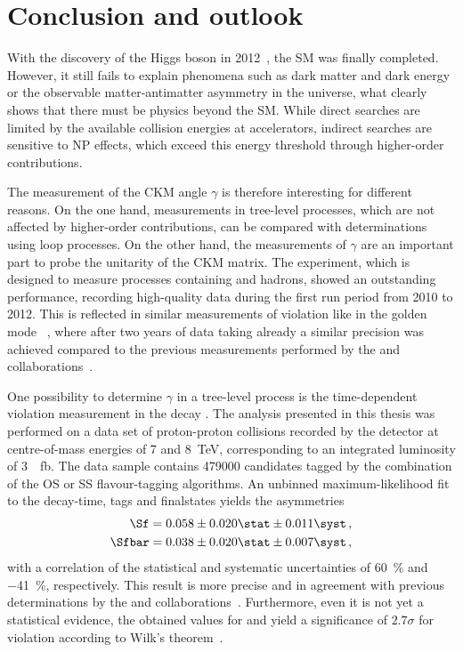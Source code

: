 \chapter{Conclusion and outlook}
\label{chap:conclusion}

\linespread{1.08}\selectfont

With the discovery of the Higgs boson in \num{2012}~\cite{Chatrchyan:2012xdj, Aad:2012tfa}, the \ac{SM} was finally completed.
However, it still fails to explain phenomena such as dark matter and dark energy or the observable matter-antimatter asymmetry in the universe, what clearly shows that there must be physics beyond the \ac{SM}.
While direct searches are limited by the available collision energies at accelerators, indirect searches are sensitive to \ac{NP} effects, which exceed this energy threshold through higher-order contributions.

The measurement of the CKM angle $\gamma$ is therefore interesting for different reasons.
On the one hand, measurements in tree-level processes, which are not affected by higher-order contributions, can be compared with determinations using loop processes.
On the other hand, the measurements of $\gamma$ are an important part to probe the unitarity of the CKM matrix.
The \lhcb experiment, which is designed to measure processes containing \bquark and \cquark hadrons, showed an outstanding performance, recording high-quality data during the first \lhc run period from \num{2010} to \num{2012}.
This is reflected in similar measurements of \CP violation like in the golden mode \BdToJPsiKS~\cite{Aaij:2015vza}, where after two years of data taking already a similar precision was achieved compared to the previous measurements performed by the \belle and \babar collaborations~\cite{Aubert:2009aw,Adachi:2012et}.

One possibility to determine $\gamma$ in a tree-level process is the time-dependent \CP violation measurement in the decay \BdToDpi.
The analysis presented in this thesis was performed on a data set of proton-proton collisions recorded by the \lhcb detector at centre-of-mass energies of \num{7} and \SI{8}{\tera\electronvolt}, corresponding to an integrated luminosity of \SI{3}{\per\femto\barn}.
The data sample contains \num{479000} \BdToDpi candidates tagged by the combination of the OS or SS flavour-tagging algorithms.
An unbinned maximum-likelihood fit to the decay-time, tags and finalstates yields the \CP asymmetries
\begin{align}
\Sf&=0.058\pm0.020\stat\pm0.011\syst\,,\nonumber\\
\Sfbar&=0.038\pm0.020\stat\pm0.007\syst\,,\nonumber
\end{align}
with a correlation of the statistical and systematic uncertainties of \SI{60}{\percent} and \SI{-41}{\percent}, respectively.
This result is more precise and in agreement with previous determinations by the \belle and \babar collaborations~\cite{Ronga:2006hv,Aubert:2006tw}.
Furthermore, even it is not yet a statistical evidence, the obtained values for \Sf and \Sfbar yield a significance of $2.7\sigma$ for \mbox{\CP violation} according to Wilk's theorem~\cite{wilks1938}.

